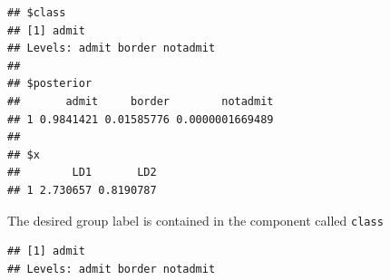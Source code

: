 \documentclass[
]{article}
\newenvironment{Shaded}{\begin{snugshade}}{\end{snugshade}}
\newcommand{\DocumentationTok}[1]{\textcolor[rgb]{0.56,0.35,0.01}{\textbf{\textit{#1}}}}
\newcommand{\NormalTok}[1]{#1}
\newcommand{\SpecialCharTok}[1]{\textcolor[rgb]{0.81,0.36,0.00}{\textbf{#1}}}
\begin{document}
\begin{verbatim}
## $class
## [1] admit
## Levels: admit border notadmit
## 
## $posterior
##       admit     border        notadmit
## 1 0.9841421 0.01585776 0.0000001669489
## 
## $x
##        LD1       LD2
## 1 2.730657 0.8190787
\end{verbatim}

The desired group label is contained in the component called
\texttt{class}

\begin{Shaded}
\end{Shaded}

\begin{verbatim}
## [1] admit
## Levels: admit border notadmit
\end{verbatim}
\end{document}
